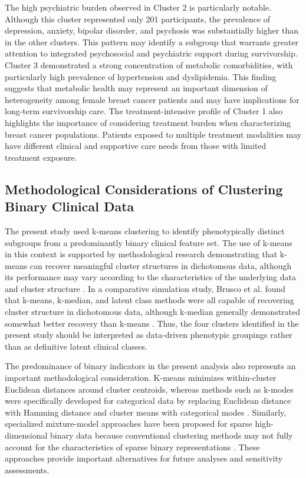 \documentclass[11pt]{article}
\begin{document}
The high psychiatric burden observed in Cluster 2 is particularly notable. Although this cluster represented only 201 participants, the prevalence of depression, anxiety, bipolar disorder, and psychosis was substantially higher than in the other clusters. This pattern may identify a subgroup that warrants greater attention to integrated psychosocial and psychiatric support during survivorship. Cluster 3 demonstrated a strong concentration of metabolic comorbidities, with particularly high prevalence of hypertension and dyslipidemia. This finding suggests that metabolic health may represent an important dimension of heterogeneity among female breast cancer patients and may have implications for long-term survivorship care. The treatment-intensive profile of Cluster 1 also highlights the importance of considering treatment burden when characterizing breast cancer populations. Patients exposed to multiple treatment modalities may have different clinical and supportive care needs from those with limited treatment exposure.

\subsection{Methodological Considerations of Clustering Binary Clinical Data}

The present study used k-means clustering to identify phenotypically distinct subgroups from a predominantly binary clinical feature set. The use of k-means in this context is supported by methodological research demonstrating that k-means can recover meaningful cluster structures in dichotomous data, although its performance may vary according to the characteristics of the underlying data and cluster structure \cite{Brusco2004,Brusco2017}. In a comparative simulation study, Brusco et al. found that k-means, k-median, and latent class methods were all capable of recovering cluster structure in dichotomous data, although k-median generally demonstrated somewhat better recovery than k-means \cite{Brusco2017}. Thus, the four clusters identified in the present study should be interpreted as data-driven phenotypic groupings rather than as definitive latent clinical classes.

The predominance of binary indicators in the present analysis also represents an important methodological consideration. K-means minimizes within-cluster Euclidean distances around cluster centroids, whereas methods such as k-modes were specifically developed for categorical data by replacing Euclidean distance with Hamming distance and cluster means with categorical modes \cite{Dorman2022}. Similarly, specialized mixture-model approaches have been proposed for sparse high-dimensional binary data because conventional clustering methods may not fully account for the characteristics of sparse binary representations \cite{Smieja2019}. These approaches provide important alternatives for future analyses and sensitivity assessments.
\end{document}
